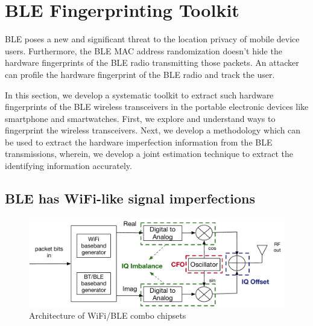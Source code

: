 
\section{BLE Fingerprinting Toolkit}
\label{sec:methodology}

BLE poses a new and significant threat to the location privacy of
mobile device users. Furthermore, the BLE MAC address randomization doesn't hide the hardware
fingerprints of the BLE radio transmitting those packets. An attacker can profile the hardware 
fingerprint of the BLE radio and track the user.

In this section, we develop a systematic toolkit to extract such hardware fingerprints of the BLE 
wireless transceivers in the portable electronic devices like smartphone and smartwatches. First, we explore and understand ways to fingerprint the wireless transceivers. Next, we develop a 
methodology which can be used to extract the hardware imperfection information from the BLE transmissions, wherein, 
we develop a joint estimation technique to extract the identifying information accurately. 

\subsection{BLE has WiFi-like signal imperfections} %
\begin{figure}[t!]
    \centering
    \includegraphics[width = \linewidth]{plots/IQchain.pdf} 
    \caption{Architecture of WiFi/BLE combo chipsets}
    \label{fig:iq_arch}
\end{figure}

